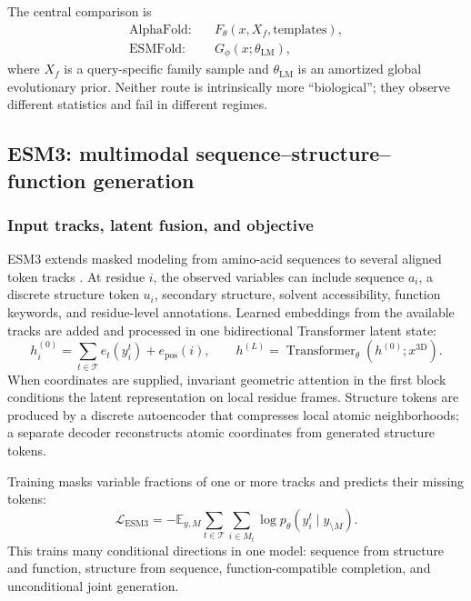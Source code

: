 \documentclass[10pt]{article}
\newcommand{\E}{\mathbb E}
\begin{document}
The central comparison is
\begin{equation}
\begin{aligned}
\text{AlphaFold:}\quad
&F_{\theta}(x,X_f,\text{templates}),\\
\text{ESMFold:}\quad
&G_{\phi}(x;\theta_{\mathrm{LM}}),
\end{aligned}
\label{eq:af-esmfold-comparison}
\end{equation}
where $X_f$ is a query-specific family sample and $\theta_{\mathrm{LM}}$ is an amortized global
evolutionary prior.  Neither route is intrinsically more ``biological''; they observe different
statistics and fail in different regimes.

\subsection{ESM3: multimodal sequence--structure--function generation}

\subsubsection{Input tracks, latent fusion, and objective}

ESM3 extends masked modeling from amino-acid sequences to several aligned token tracks
\cite{hayes2024}.  At residue $i$, the observed variables can include sequence $a_i$, a discrete
structure token $u_i$, secondary structure, solvent accessibility, function keywords, and
residue-level annotations.  Learned embeddings from the available tracks are added and processed
in one bidirectional Transformer latent state:
\begin{equation}
h_i^{(0)}
=\sum_{t\in\mathcal T}e_t(y_i^t)+e_{\mathrm{pos}}(i),
\qquad
h^{(L)}=\operatorname{Transformer}_\theta(h^{(0)};x^{\mathrm{3D}}).
\label{eq:esm3-track-fusion}
\end{equation}
When coordinates are supplied, invariant geometric attention in the first block conditions the
latent representation on local residue frames.  Structure tokens are produced by a discrete
autoencoder that compresses local atomic neighborhoods; a separate decoder reconstructs atomic
coordinates from generated structure tokens.

Training masks variable fractions of one or more tracks and predicts their missing tokens:
\begin{equation}
\mathcal L_{\mathrm{ESM3}}
=-\E_{y,M}\sum_{t\in\mathcal T}\sum_{i\in M_t}
\log p_\theta(y_i^t\mid y_{\setminus M}).
\label{eq:esm3-loss}
\end{equation}
This trains many conditional directions in one model: sequence from structure and function,
structure from sequence, function-compatible completion, and unconditional joint generation.
\end{document}
